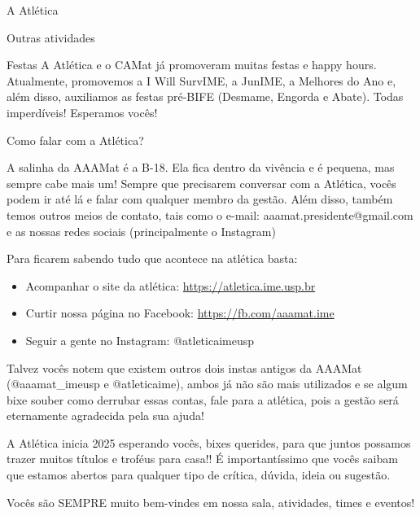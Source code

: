 \begin{secao}{A Atlética}
\begin{subsecao}{Outras atividades}
\begin{subsubsecao}{Festas}
A Atlética e o CAMat já promoveram muitas festas e happy hours. Atualmente,
promovemos a I Will SurvIME, a JunIME, a Melhores do Ano e, além disso, 
auxiliamos as festas pré-BIFE (Desmame, Engorda e Abate). Todas imperdíveis!
Esperamos vocês!

\end{subsubsecao}
\begin{subsubsecao}{Como falar com a Atlética?}

A salinha da AAAMat é a B-18. Ela fica dentro da vivência e é pequena, mas
sempre cabe mais um! Sempre que precisarem conversar com a Atlética, vocês
podem ir até lá e falar com qualquer membro da gestão. Além disso, também temos
outros meios de contato, tais como o e-mail: aaamat.presidente@gmail.com  e as
nossas redes sociais (principalmente o Instagram)

Para ficarem sabendo tudo que acontece na atlética basta:

\begin{itemize}
  \item Acompanhar o site da atlética: \url{https://atletica.ime.usp.br}
  \item Curtir nossa página no Facebook: \url{https://fb.com/aaamat.ime}
  \item Seguir a gente no Instagram: @atleticaimeusp
\end{itemize}

Talvez vocês notem que existem outros dois instas antigos da AAAMat
(@aaamat\_imeusp e @atleticaime), ambos já não são mais utilizados
e se algum bixe souber como derrubar essas contas, fale para a atlética, 
pois a gestão será eternamente agradecida pela sua ajuda! 

A Atlética inicia 2025 esperando vocês, bixes querides, para que juntos
possamos trazer muitos títulos e troféus para casa!! É importantíssimo que
vocês saibam que estamos abertos para qualquer tipo de crítica, dúvida, ideia
ou sugestão.

Vocês são SEMPRE muito bem-vindes em nossa sala, atividades, times e eventos!
\end{subsubsecao}
\end{subsecao}
\end{secao}
\pagebreak
